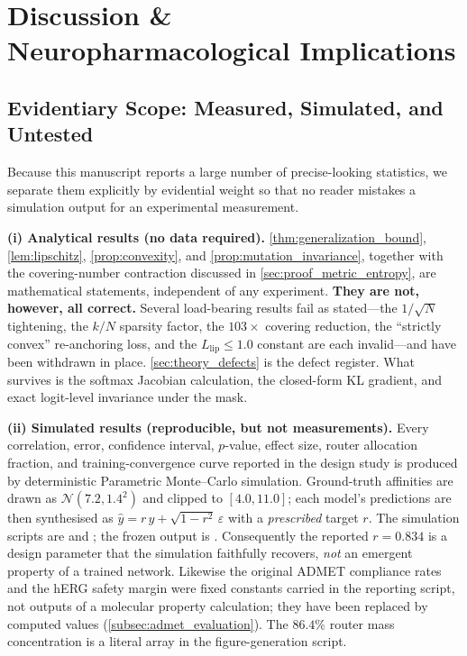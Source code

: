 \documentclass{article}
\theoremstyle{definition}
\begin{document}
\section{Discussion \& Neuropharmacological Implications}
\label{sec:discussion}

\subsection{Evidentiary Scope: Measured, Simulated, and Untested}
\label{sec:evidentiary_scope}

Because this manuscript reports a large number of precise-looking statistics, we separate them explicitly by evidential weight so that no reader mistakes a simulation output for an experimental measurement.

\textbf{(i) Analytical results (no data required).} \cref{thm:generalization_bound}, \cref{lem:lipschitz}, \cref{prop:convexity}, and \cref{prop:mutation_invariance}, together with the covering-number contraction discussed in \cref{sec:proof_metric_entropy}, are mathematical statements, independent of any experiment. \textbf{They are not, however, all correct.} Several load-bearing results fail as stated---the $1/\sqrt{N}$ tightening, the $k/N$ sparsity factor, the $103\times$ covering reduction, the ``strictly convex'' re-anchoring loss, and the $L_{\text{lip}} \le 1.0$ constant are each invalid---and have been withdrawn in place. \cref{sec:theory_defects} is the defect register. What survives is the softmax Jacobian calculation, the closed-form KL gradient, and exact logit-level invariance under the mask.

\textbf{(ii) Simulated results (reproducible, but not measurements).} Every correlation, error, confidence interval, $p$-value, effect size, router allocation fraction, and training-convergence curve reported in the design study is produced by deterministic Parametric Monte--Carlo simulation. Ground-truth affinities are drawn as $\mathcal{N}(7.2, 1.4^{2})$ and clipped to $[4.0, 11.0]$; each model's predictions are then synthesised as $\hat{y} = r\,y + \sqrt{1-r^{2}}\,\varepsilon$ with a \emph{prescribed} target $r$. The simulation scripts are  and ; the frozen output is . Consequently the reported $r = 0.834$ is a design parameter that the simulation faithfully recovers, \emph{not} an emergent property of a trained network. Likewise the original ADMET compliance rates and the hERG safety margin were fixed constants carried in the reporting script, not outputs of a molecular property calculation; they have been replaced by computed values (\cref{subsec:admet_evaluation}). The $86.4\%$ router mass concentration is a literal array in the figure-generation script.
\end{document}
